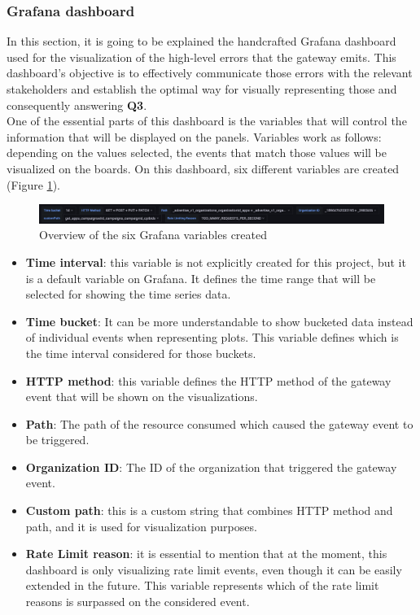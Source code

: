 \documentclass[english, 12pt, a4paper, sci, utf8, a-1b, online]{aaltothesis}
\begin{document}
\subsubsection{Grafana dashboard}

In this section, it is going to be explained the handcrafted Grafana dashboard used for the visualization of the high-level errors that the gateway emits. This dashboard's objective is to effectively communicate those errors with the relevant stakeholders and establish the optimal way for visually representing those and consequently answering \textbf{Q3}.\\

One of the essential parts of this dashboard is the variables that will control the information that will be displayed on the panels. Variables work as follows: depending on the values selected, the events that match those values will be visualized on the boards. On this dashboard, six different variables are created (Figure \ref{fig:grafana-vars}).

\begin{figure}[h!]
    \centering
    \includegraphics[scale=0.3]{src/thesis/img/technical-solution/grafana-dashboard/grafana-variables.png}
    \caption{Overview of the six Grafana variables created}
    \label{fig:grafana-vars}
\end{figure}

\begin{itemize}
    \item \textbf{Time interval}: this variable is not explicitly created for this project, but it is a default variable on Grafana. It defines the time range that will be selected for showing the time series data.
    \item \textbf{Time bucket}: It can be more understandable to show bucketed data instead of individual events when representing plots. This variable defines which is the time interval considered for those buckets.
    \item \textbf{HTTP method}: this variable defines the HTTP method of the gateway event that will be shown on the visualizations.
    \item \textbf{Path}: The path of the resource consumed which caused the gateway event to be triggered.
    \item \textbf{Organization ID}: The ID of the organization that triggered the gateway event.
    \item \textbf{Custom path}: this is a custom string that combines HTTP method and path, and it is used for visualization purposes.
    \item \textbf{Rate Limit reason}: it is essential to mention that at the moment, this dashboard is only visualizing rate limit events, even though it can be easily extended in the future. This variable represents which of the rate limit reasons is surpassed on the considered event.
\end{itemize}
\end{document}
